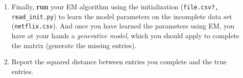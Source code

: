 \begin{enumerate}
\begin{enumerate}
\item Finally, \textbf{run} your EM algorithm using the initialization (\texttt{file.csv?, read\_init.py}) to learn the model parameters on the incomplete data set (\texttt{netflix.csv}). And once you have learned the parameters using EM, you have at your hands a \emph{generative model}, which you should apply to complete the matrix (generate the missing entries).

\item Report the squared distance between entries you complete and the true entries. 

\end{enumerate} 


\end{enumerate}





